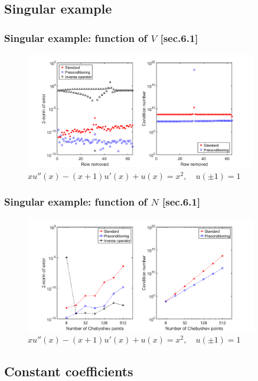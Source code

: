 \documentclass{beamer}
\begin{document}
\subsection{Singular example}

\begin{frame}
\frametitle{Singular example: function of $V$ [sec.6.1] }
\begin{figure}
\includegraphics[width=0.9\textwidth]{example_SingCoeffs_02.png}
\caption{$x u''(x) - (x+1) u'(x) + u(x) = x^2, \quad u(\pm 1) = 1$}
\end{figure}
\end{frame}

\begin{frame}
\frametitle{Singular example: function of $N$ [sec.6.1] }
\begin{figure}
\includegraphics[width=0.9\textwidth]{example_SingCoeffs_03.png}
\caption{$x u''(x) - (x+1) u'(x) + u(x) = x^2, \quad u(\pm 1) = 1$}
\end{figure}
\end{frame}

\subsection{Constant coefficients}
\end{document}
